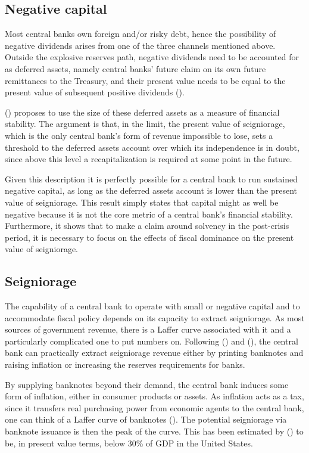\documentclass[american]{scrartcl}
\newcommand{\citein}[1]{\citeauthor{#1} (\citeyear{#1})}
\begin{document}
\subsection{Negative capital} \label{sec_negative}

Most central banks own foreign and/or risky debt, hence the possibility of negative dividends arises from one of the three channels mentioned above. Outside the explosive reserves path, negative dividends need to be accounted for as deferred assets, namely central banks' future claim on its own future remittances to the Treasury, and their present value needs to be equal to the present value of subsequent positive dividends (\cite{Archer2013}).

\citein{Reis2015} proposes to use the size of these deferred assets as a measure of financial stability. The argument is that, in the limit, the present value of seigniorage, which is the only central bank's form of revenue impossible to lose, sets a threshold to the deferred assets account over which its independence is in doubt, since above this level a recapitalization is required at some point in the future.

Given this description it is perfectly possible for a central bank to run sustained negative capital, as long as the deferred assets account is lower than the present value of seigniorage. This result simply states that capital might as well be negative because it is not the core metric of a central bank's financial stability. Furthermore, it shows that to make a claim around solvency in the post-crisis period, it is necessary to focus on the effects of fiscal dominance on the present value of seigniorage.

\subsection{Seigniorage}

The capability of a central bank to operate with small or negative capital and to accommodate fiscal policy depends on its capacity to extract seigniorage. As most sources of government revenue, there is a Laffer curve associated with it and a particularly complicated one to put numbers on. Following \citein{Reis2016} and \citein{Hilscher2014}, the central bank can practically extract seigniorage revenue either by printing banknotes and raising inflation or increasing the reserves requirements for banks.

By supplying banknotes beyond their demand, the central bank induces some form of inflation, either in consumer products or assets. As inflation acts as a tax, since it transfers real purchasing power from economic agents to the central bank, one can think of a Laffer curve of banknotes (\cite[p.~17]{Reis2016}). The potential seigniorage via banknote issuance is then the peak of the curve. This has been estimated by \citein{Hilscher2014} to be, in present value terms, below 30\% of GDP in the United States.
\end{document}
